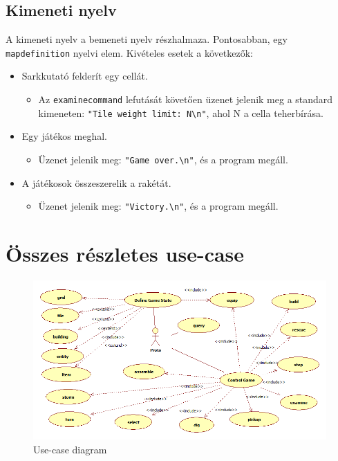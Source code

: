 \subsection{Kimeneti nyelv}
A kimeneti nyelv a bemeneti nyelv részhalmaza. Pontosabban, egy  \texttt{map\textunderscore{}definition} nyelvi elem. Kivételes esetek a következők:
\begin{itemize}
\item Sarkkutató felderít egy cellát.
	\begin{itemize}
	\item Az \texttt{examine\textunderscore{}command} lefutását követően üzenet jelenik meg a standard kimeneten: \newline \texttt{"Tile weight limit: N\textbackslash{}n"}, ahol N a cella teherbírása.
	\end{itemize}
\item Egy játékos meghal.
	\begin{itemize}
	\item Üzenet jelenik meg: \texttt{"Game over.\textbackslash{}n"}, és a program megáll.
	\end{itemize}
\item A játékosok összeszerelik a rakétát.
	\begin{itemize}
	\item Üzenet jelenik meg: \texttt{"Victory.\textbackslash{}n"}, és a program megáll.
	\end{itemize}
\end{itemize}

\section{Összes részletes use-case}

\begin{figure}[h]
\begin{center}
\includegraphics[width=17cm]{chapters/chapter07/ProtoUseCases.png}
\caption{Use-case diagram}
\label{fig:ProtoUseCases}
\end{center}
\end{figure}


